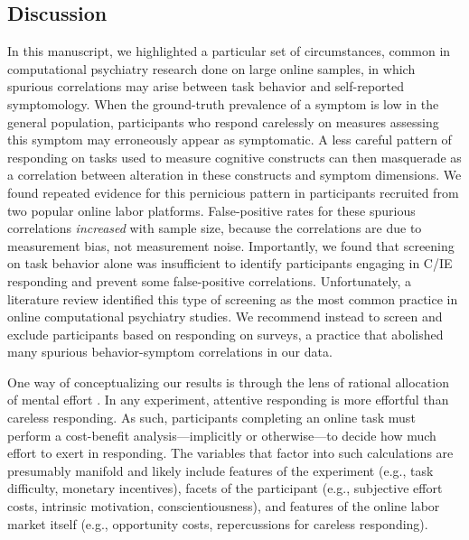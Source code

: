 \documentclass[a4paper,notitlepage,12pt]{article}
\begin{document}
\begin{refsection}[main]
\section*{Discussion}

In this manuscript, we highlighted a particular set of circumstances, common in computational psychiatry research done on large online samples, in which spurious correlations may arise between task behavior and self-reported symptomology. When the ground-truth prevalence of a symptom is low in the general population, participants who respond carelessly on measures assessing this symptom may erroneously appear as symptomatic. A less careful pattern of responding on tasks used to measure cognitive constructs can then masquerade as a correlation between alteration in these constructs and symptom dimensions. We found repeated evidence for this pernicious pattern in participants recruited from two popular online labor platforms. False-positive rates for these spurious correlations \emph{increased} with sample size, because the correlations are due to measurement bias, not measurement noise. Importantly, we found that screening on task behavior alone was insufficient to identify participants engaging in C/IE responding and prevent some false-positive correlations. Unfortunately, a literature review identified this type of screening as the most common practice in online computational psychiatry studies. We recommend instead to screen and exclude participants based on responding on surveys, a practice that abolished many spurious behavior-symptom correlations in our data. 

One way of conceptualizing our results is through the lens of rational allocation of mental effort \cite{kool2018mental}. In any experiment, attentive responding is more effortful than careless responding. As such, participants completing an online task must perform a cost-benefit analysis---implicitly or otherwise---to decide how much effort to exert in responding. The variables that factor into such calculations are presumably manifold and likely include features of the experiment (e.g., task difficulty, monetary incentives), facets of the participant (e.g., subjective effort costs, intrinsic motivation, conscientiousness), and features of the online labor market itself (e.g., opportunity costs, repercussions for careless responding). 


\end{refsection}
\end{document}
